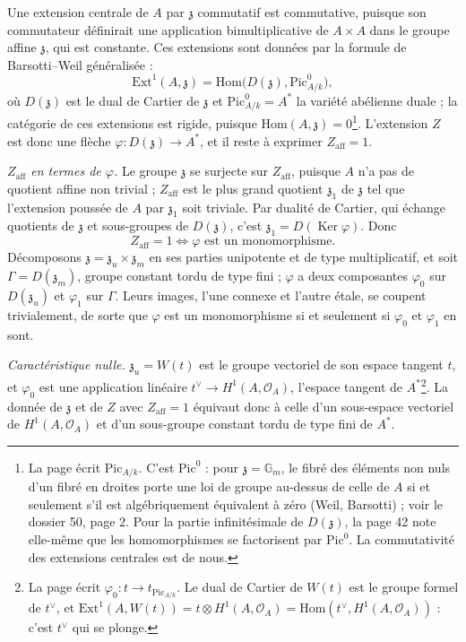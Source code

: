 \documentclass[11pt,a4paper]{article}
\begin{document}
Une extension centrale de $A$ par $\mathfrak{z}$ commutatif est
commutative, puisque son commutateur définirait une application
bimultiplicative de $A \times A$ dans le groupe affine $\mathfrak{z}$, qui
est constante. Ces extensions sont données par la formule de Barsotti–Weil
généralisée :
\[
\mathrm{Ext}^{1}(A, \mathfrak{z}) =
\mathrm{Hom}\bigl(D(\mathfrak{z}), \mathrm{Pic}^{0}_{A/k}\bigr),
\]
où $D(\mathfrak{z})$ est le dual de Cartier de $\mathfrak{z}$ et
$\mathrm{Pic}^{0}_{A/k} = A^{*}$ la variété abélienne duale ; la catégorie de
ces extensions est rigide, puisque $\mathrm{Hom}(A, \mathfrak{z}) =
0$\footnote{La page écrit $\mathrm{Pic}_{A/k}$. C'est
$\mathrm{Pic}^{0}$ : pour $\mathfrak{z} = \mathbb{G}_m$, le fibré des
éléments non nuls d'un fibré en droites porte une loi de groupe au-dessus de
celle de $A$ si et seulement s'il est algébriquement équivalent à zéro
(Weil, Barsotti) ; voir le dossier 50, page 2. Pour la partie
infinitésimale de $D(\mathfrak{z})$, la page 42 note elle-même que les
homomorphismes se factorisent par $\mathrm{Pic}^{0}$. La commutativité des
extensions centrales est de nous.}. L'extension $Z$ est donc une flèche
$\varphi \colon D(\mathfrak{z}) \to A^{*}$, et il reste à exprimer
$Z_{\mathrm{aff}} = 1$.

\emph{$Z_{\mathrm{aff}}$ en termes de $\varphi$.} Le groupe $\mathfrak{z}$
se surjecte sur $Z_{\mathrm{aff}}$, puisque $A$ n'a pas de quotient affine
non trivial ; $Z_{\mathrm{aff}}$ est le plus grand quotient $\mathfrak{z}_1$
de $\mathfrak{z}$ tel que l'extension poussée de $A$ par $\mathfrak{z}_1$
soit triviale. Par dualité de Cartier, qui échange quotients de
$\mathfrak{z}$ et sous-groupes de $D(\mathfrak{z})$, c'est
$\mathfrak{z}_1 = D(\operatorname{Ker}\varphi)$. Donc
\[
Z_{\mathrm{aff}} = 1 \iff \varphi \text{ est un monomorphisme.}
\]
Décomposons $\mathfrak{z} = \mathfrak{z}_u \times \mathfrak{z}_m$ en ses
parties unipotente et de type multiplicatif, et soit $\Gamma =
D(\mathfrak{z}_m)$, groupe constant tordu de type fini ; $\varphi$ a deux
composantes $\varphi_0$ sur $D(\mathfrak{z}_u)$ et $\varphi_1$ sur $\Gamma$.
Leurs images, l'une connexe et l'autre étale, se coupent trivialement, de
sorte que $\varphi$ est un monomorphisme si et seulement si $\varphi_0$ et
$\varphi_1$ en sont.

\emph{Caractéristique nulle.} $\mathfrak{z}_u = W(t)$ est le groupe
vectoriel de son espace tangent $t$, et $\varphi_0$ est une application
linéaire $t^{\vee} \to H^{1}(A, \mathcal{O}_A)$, l'espace tangent de
$A^{*}$\footnote{La page écrit $\varphi_0 \colon t \to
t_{\mathrm{Pic}_{A/k}}$. Le dual de Cartier de $W(t)$ est le
groupe formel de $t^{\vee}$, et $\mathrm{Ext}^{1}(A, W(t)) = t \otimes
H^{1}(A, \mathcal{O}_A) = \mathrm{Hom}(t^{\vee}, H^{1}(A, \mathcal{O}_A))$ :
c'est $t^{\vee}$ qui se plonge.}. La donnée de $\mathfrak{z}$ et de $Z$ avec
$Z_{\mathrm{aff}} = 1$ équivaut donc à celle d'un sous-espace vectoriel de
$H^{1}(A, \mathcal{O}_A)$ et d'un sous-groupe constant tordu de type fini de
$A^{*}$.
\end{document}
